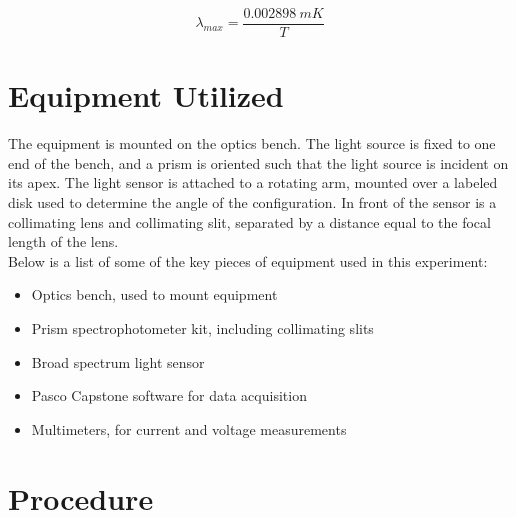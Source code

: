 \documentclass[a4paper]{article}
\begin{document}
\begin{equation}
\label{eq:wien}
\lambda_{max} = \frac{0.002898 \: mK}{T}
\end{equation}

\section{Equipment Utilized}

\qq The equipment is mounted on the optics bench. The light source is fixed to one end of the bench, and a prism is oriented such that the light source is incident on its apex. The light sensor is attached to a rotating arm, mounted over a labeled disk used to determine the angle of the configuration. In front of the sensor is a collimating lens and collimating slit, separated by a distance equal to the focal length of the lens. \\

Below is a list of some of the key pieces of equipment used in this experiment:

\begin{itemize}
\item Optics bench, used to mount equipment
\item Prism spectrophotometer kit, including collimating slits
\item Broad spectrum light sensor
\item Pasco Capstone software for data acquisition
\item Multimeters, for current and voltage measurements
\end{itemize}

\begin{figure}[H]
\centering
\label{Diagram}
\end{figure}

\section{Procedure}
\end{document}
